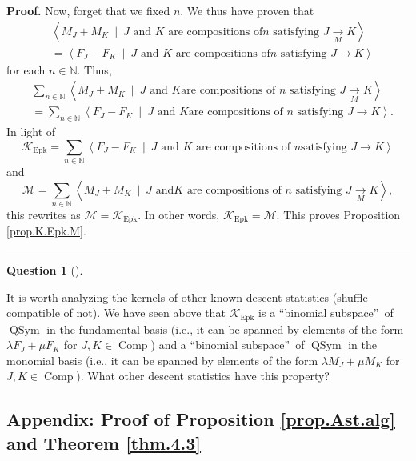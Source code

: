 \documentclass[numbers=enddot,12pt,final,onecolumn,notitlepage]{scrartcl}%
\theoremstyle{definition}
\newtheorem{quest}[theo]{Question}
\newenvironment{question}[1][]
{\begin{quest}[#1]\begin{leftbar}}
{\end{leftbar}\end{quest}}
\newenvironment{proof}[1][Proof]{\noindent\textbf{#1.} }{\ \rule{0.5em}{0.5em}}
\newenvironment{question}[1][Question]{\noindent\textbf{#1.} }{\ \rule{0.5em}{0.5em}}
\let\sumnonlimits\sum
\renewcommand{\sum}{\sumnonlimits\limits}
\begin{document}
\begin{proof}
Now, forget that we fixed $n$. We thus have proven that
\begin{align*}
&  \left\langle M_{J}+M_{K}\ \mid\ J\text{ and }K\text{ are compositions of
}n\text{ satisfying }J\underset{M}{\rightarrow}K\right\rangle \\
&  =\left\langle F_{J}-F_{K}\ \mid\ J\text{ and }K\text{ are compositions of
}n\text{ satisfying }J\rightarrow K\right\rangle
\end{align*}
for each $n\in\mathbb{N}$. Thus,%
\begin{align*}
&  \sum_{n\in\mathbb{N}}\left\langle M_{J}+M_{K}\ \mid\ J\text{ and }K\text{
are compositions of }n\text{ satisfying }J\underset{M}{\rightarrow
}K\right\rangle \\
&  =\sum_{n\in\mathbb{N}}\left\langle F_{J}-F_{K}\ \mid\ J\text{ and }K\text{
are compositions of }n\text{ satisfying }J\rightarrow K\right\rangle .
\end{align*}
In light of%
\[
\mathcal{K}_{\operatorname*{Epk}}=\sum_{n\in\mathbb{N}}\left\langle
F_{J}-F_{K}\ \mid\ J\text{ and }K\text{ are compositions of }n\text{
satisfying }J\rightarrow K\right\rangle
\]
and%
\[
\mathcal{M}=\sum_{n\in\mathbb{N}}\left\langle M_{J}+M_{K}\ \mid\ J\text{ and
}K\text{ are compositions of }n\text{ satisfying }J\underset{M}{\rightarrow
}K\right\rangle ,
\]
this rewrites as $\mathcal{M}=\mathcal{K}_{\operatorname*{Epk}}$. In other
words, $\mathcal{K}_{\operatorname*{Epk}}=\mathcal{M}$. This proves
Proposition \ref{prop.K.Epk.M}.
\end{proof}

\begin{question}
It is worth analyzing the kernels of other known descent statistics
(shuffle-compatible of not). We have seen above that $\mathcal{K}%
_{\operatorname*{Epk}}$ is a \textquotedblleft binomial
subspace\textquotedblright\ of $\operatorname*{QSym}$ in the fundamental basis
(i.e., it can be spanned by elements of the form $\lambda F_{J}+\mu F_{K}$ for
$J,K\in\operatorname*{Comp}$) and a \textquotedblleft binomial
subspace\textquotedblright\ of $\operatorname*{QSym}$ in the monomial basis
(i.e., it can be spanned by elements of the form $\lambda M_{J}+\mu M_{K}$ for
$J,K\in\operatorname*{Comp}$). What other descent statistics have this property?
\end{question}

\subsection{\label{subsect.K.pfAsh}Appendix: Proof of Proposition
\ref{prop.Ast.alg} and Theorem \ref{thm.4.3}}
\end{document}
